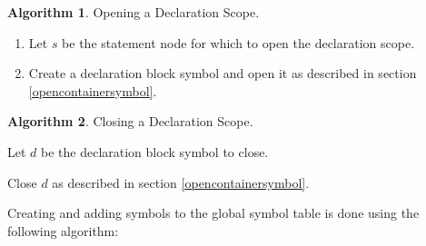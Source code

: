 \documentclass[a4paper,oneside,11pt]{book}
\theoremstyle{definition}
\newtheorem{algo}{Algorithm}[section]
\begin{document}
\begin{algo}\label{opendeclarationscope} Opening a Declaration Scope.
\begin{enumerate}
\item
Let $s$ be the statement node for which to open the declaration scope.
\item
Create a declaration block symbol and open it as described in section \ref{opencontainersymbol}.
\end{enumerate}
\end{algo}

\begin{algo}\label{closedeclarationscope} Closing a Declaration Scope.
\item
Let $d$ be the declaration block symbol to close.
\item
Close $d$ as described in section \ref{opencontainersymbol}.
\end{algo}

Creating and adding symbols to the global symbol table is done using the following algorithm:
\end{document}
